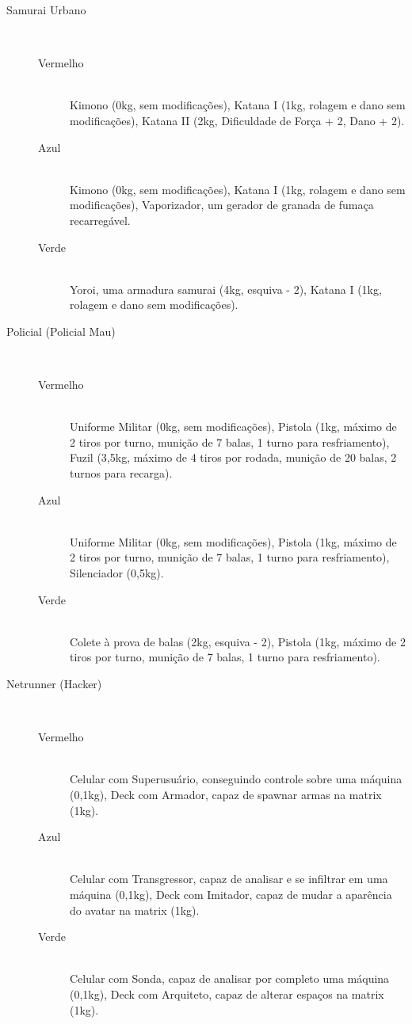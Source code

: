 \documentclass[a4paper]{article}
\begin{document}
\begin{description}
\begin{description}
    \item[Samurai Urbano] \hfill \\ 
        \begin{description}
            \item[Vermelho] \hfill \\ Kimono (0kg, sem modificações), Katana I (1kg, rolagem e dano sem modificações), Katana II (2kg, Dificuldade de Força + 2, Dano + 2).
            \item[Azul] \hfill \\ Kimono (0kg, sem modificações), Katana I (1kg, rolagem e dano sem modificações), Vaporizador, um gerador de granada de fumaça recarregável.
            \item[Verde] \hfill \\ Yoroi, uma armadura samurai (4kg, esquiva - 2), Katana I (1kg, rolagem e dano sem modificações).
        \end{description}
    \item[Policial (Policial Mau)] \hfill \\ 
        \begin{description}
            \item[Vermelho] \hfill \\ Uniforme Militar (0kg, sem modificações), Pistola (1kg, máximo de 2 tiros por turno, munição de 7 balas, 1 turno para resfriamento), Fuzil (3,5kg, máximo de 4 tiros por rodada, munição de 20 balas, 2 turnos para recarga).
            \item[Azul] \hfill \\ Uniforme Militar (0kg, sem modificações), Pistola (1kg, máximo de 2 tiros por turno, munição de 7 balas, 1 turno para resfriamento), Silenciador (0,5kg).
            \item[Verde] \hfill \\ Colete à prova de balas (2kg, esquiva - 2), Pistola (1kg, máximo de 2 tiros por turno, munição de 7 balas, 1 turno para resfriamento).
        \end{description}
    \item[Netrunner (Hacker)] \hfill \\ 
        \begin{description}
            \item[Vermelho] \hfill \\ Celular com Superusuário, conseguindo controle sobre uma máquina (0,1kg), Deck com Armador, capaz de spawnar armas na matrix (1kg).
            \item[Azul] \hfill \\ Celular com Transgressor, capaz de analisar e se infiltrar em uma máquina (0,1kg), Deck com Imitador, capaz de mudar a aparência do avatar na matrix (1kg).
            \item[Verde] \hfill \\ Celular com Sonda, capaz de analisar por completo uma máquina (0,1kg), Deck com Arquiteto, capaz de alterar espaços na matrix (1kg).
        \end{description}
\end{description}
    

    

    

    

\end{description}
\end{document}
